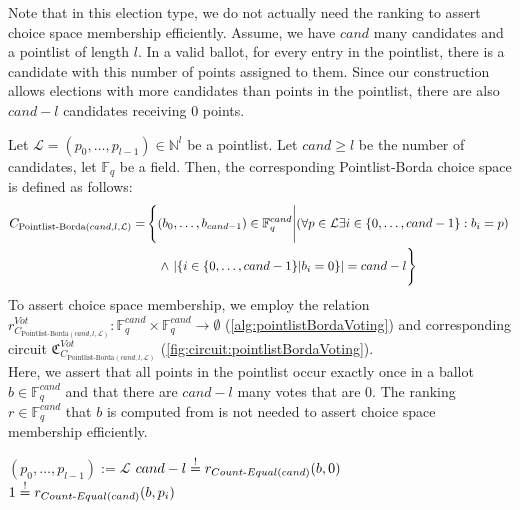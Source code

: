 Note that in this election type, we do not actually need the ranking to assert choice space membership efficiently.
Assume, we have $cand$ many candidates and a pointlist of length $l$.
In a valid ballot, for every entry in the pointlist, there is a candidate with this number of points assigned to them.
Since our construction allows elections with more candidates than points in the pointlist, there are also $cand-l$ candidates receiving $0$ points.

\begin{definition}
    Let $\mathcal{L}=(p_0,\dots, p_{l-1})\in\mathbb{N}^l$ be a pointlist.
    Let $cand\geq l$ be the number of candidates, let $\mathbb{F}_q$ be a field.
    Then, the corresponding Pointlist-Borda choice space is defined as follows:
    {\setlength{\mathindent}{2pt}
    \begin{align*}
        C_{\text{Pointlist-Borda}(cand, l, \mathcal{L})}=& \left\{(b_0,\dots, b_{cand-1})\in \mathbb{F}_q^{cand}\Bigg| (\forall p\in\mathcal{L}\exists i\in\{0,\dots, cand-1\}: b_i=p)\right.\\
        &\quad\land \left. \vphantom{\Bigg|} |\{i\in \{0,\dots, cand-1\}|b_i=0\}|=cand-l\right\}
    \end{align*}
    }
    To assert choice space membership, we employ the relation $r_{C_{\text{Pointlist-Borda}(cand, l, \mathcal{L})}}^{Vot}:\mathbb{F}_q^{cand}\times\mathbb{F}_q^{cand}\to\emptyset$ (\cref{alg:pointlistBordaVoting}) and corresponding circuit $\mathfrak{C}_{C_{\text{Pointlist-Borda}(cand, l, \mathcal{L})}}^{Vot}$ (\cref{fig:circuit:pointlistBordaVoting}).\\
    Here, we assert that all points in the pointlist occur exactly once in a ballot $b\in\mathbb{F}_q^{cand}$ and that there are $cand-l$ many votes that are $0$.
    The ranking $r\in\mathbb{F}_q^{cand}$ that $b$ is computed from is not needed to assert choice space membership efficiently.
\end{definition}

\begin{Algorithmus}[h] %
    \caption{Function $r_{C_{\text{Pointlist-Borda}(cand, l, \mathcal{L})}}^{Vot}$ used to assert that a ballot $b\in\mathbb{F}_q^{cand}$ computed from a ranking $r\in\mathbb{F}_q^{cand}$ is part of the choice space $C_{\text{Pointlist-Borda}(cand, l, \mathcal{L})}$.
    Here, we use $r_{Count\text{-}Equal(cand)}(b, v)$ (\cref{section:appendix:counting}) to count how often the value $v$ appears in $b=(b_0,\dots, b_{cand-1})$.
    }
    \label{alg:pointlistBordaVoting}
    \begin{algorithmic}
        \State $(p_0,\dots, p_{l-1}):=\mathcal{L}$
        \State $cand-l \overset{!}{=} r_{Count\text{-}Equal(cand)}(b, 0)$
            \State $1\overset{!}{=} r_{Count\text{-}Equal(cand)}(b, p_i)$
        \EndFor
    \EndProcedure
    \end{algorithmic}
\end{Algorithmus}

